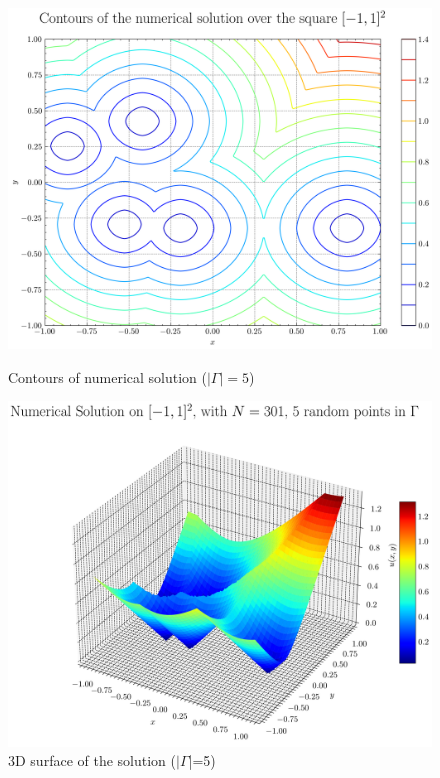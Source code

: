\documentclass[11pt]{article}
\theoremstyle{definition}
\theoremstyle{remark}
\begin{document}
\begin{figure}[h]
  \centering
  \begin{minipage}{0.45\textwidth}
    \centering
    \includegraphics[width=\linewidth]{plots/contour_plot_random5.png}
    \caption{Contours of numerical solution ($|\Gamma|=5$)}
    \label{fig:contour5}
  \end{minipage}
  \hfill
  \begin{minipage}{0.45\textwidth}
    \centering
    \includegraphics[width=\linewidth]{plots/solution_3d_surface_random5.png}
    \caption{3D surface of the solution ($|\Gamma$|=5)}
    \label{fig:surface5}
  \end{minipage}
\end{figure}
\end{document}
